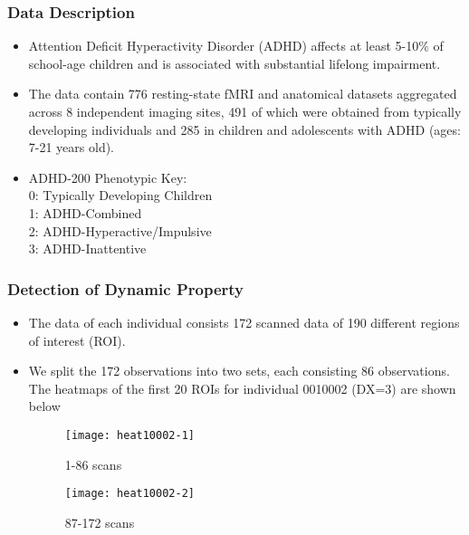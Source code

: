 \documentclass{beamer}
\begin{document}

\begin{frame}
\frametitle{Data Description}
\begin{itemize}
\item Attention Deficit Hyperactivity Disorder (ADHD) affects at least 5-10$\% $ of school-age children and is associated with substantial lifelong impairment.
\item The data contain 776 resting-state fMRI and anatomical datasets aggregated across 8 independent imaging sites, 491 of which were obtained from typically developing individuals and 285 in children and adolescents with ADHD (ages: 7-21 years old). 
\item ADHD-200 Phenotypic Key:\\
0: Typically Developing Children\\
1: ADHD-Combined\\
2: ADHD-Hyperactive/Impulsive\\
3: ADHD-Inattentive\\

\end{itemize}

\end{frame}


\begin{frame}
\frametitle{Detection of Dynamic Property}
\begin{itemize}
\item The data of each individual consists 172 scanned data of 190 different regions of interest (ROI).
\item We split the 172 observations into two sets, each consisting 86 observations. The heatmaps of the first 20 ROIs for individual 0010002 (DX=3) are shown below
\begin{figure}
	\begin{minipage}[t]{0.45\linewidth}
		\centering
		\texttt{[image: heat10002-1]}
		\caption{1-86 scans}
	\end{minipage}
	\begin{minipage}[t]{0.45\linewidth}
		\centering
		\texttt{[image: heat10002-2]}
		\caption{87-172 scans}
	\end{minipage}
\end{figure}

\end{itemize}

\end{frame}
\end{document}
